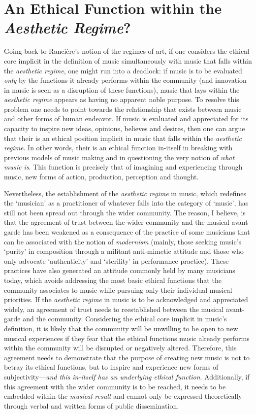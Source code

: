 \section{An Ethical Function within the \emph{Aesthetic Regime}?}

Going back to Ranci\`{e}re's notion of the regimes of art, if one considers the ethical core implicit in the definition of music simultaneously with music that falls within the \emph{aesthetic regime}, one might run into a deadlock: if music is to be evaluated \emph{only} by the functions it already performs within the community (and innovation in music is seen as a disruption of these functions), music that lays within the \emph{aesthetic regime} appears as having no apparent noble purpose. To resolve this problem one needs to point towards the relationship that exists between music and other forms of human endeavor. If music is evaluated and appreciated for its capacity to inspire new ideas, opinions, believes and desires, then one can argue that their is an ethical position implicit in music that falls within the \emph{aesthetic regime}. In other words, their is an ethical function in-itself in breaking with previous models of music making and in questioning the very notion of \emph{what music is}. This function is precisely that of imagining and experiencing through music, new forms of action, production, perception and thought.

Nevertheless, the establishment of the \emph{aesthetic regime} in music, which redefines the `musician' as a practitioner of whatever falls into the category of `music', has still not been spread out through the wider community. The reason, I believe, is that the agreement of trust between the wider community and the musical avant-garde has been weakened as a consequence of the practice of some musicians that can be associated with the notion of \emph{modernism} (mainly, those seeking music's `purity'  in composition through a militant anti-mimetic attitude and those who only advocate `authenticity' and `sterility' in performance practice). These practices have also generated an attitude commonly held by many musicians today, which avoids addressing the most basic ethical functions that the community associates to music while pursuing only their individual musical priorities. If the \emph{aesthetic regime} in music is to be acknowledged and appreciated widely, an agreement of trust needs to reestablished between the musical avant-garde and the community. Considering the ethical core implicit in music's definition, it is likely that the community will be unwilling to be open to new musical experiences if they fear that the ethical functions music already performs within the community will be disrupted or negatively altered. Therefore, this agreement needs to demonstrate that the purpose of creating new music is not to betray its ethical functions, but to inspire and experience new forms of subjectivity---\emph{and this in-itself has an underlying ethical function}. Additionally, if this agreement with the wider community is to be reached, it needs to be embedded within the \emph{musical result} and cannot only be expressed theoretically through verbal and written forms of public dissemination.

